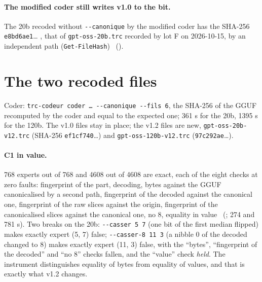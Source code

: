 \paragraph{The modified coder still writes v1.0 to the bit.} The 20b recoded without \texttt{-{}-canonique} by the modified coder has the SHA-256 \texttt{e8bd6ae1}\dots{} \parencite{fips180-4}, that of \texttt{gpt-oss-20b.trc} recorded by lot F on 2026-10-15, by an independent path (\texttt{Get-FileHash}) \mes~().

\section{The two recoded files}\label{t3cod:sec:fichiers}

Coder: \texttt{trc-codeur coder \dots{} -{}-canonique -{}-fils 6}, the SHA-256 of the GGUF recomputed by the coder and equal to the expected one; 361 s for the 20b, \num{1395} s for the 120b. The v1.0 files stay in place; the v1.2 files are new, \texttt{gpt-oss-20b-v12.trc} (SHA-256 \texttt{ef1cf740}\dots) and \texttt{gpt-oss-120b-v12.trc} (\texttt{97c292ae}\dots).

\paragraph{C1 in value.} 768 experts out of 768 and \num{4608} out of \num{4608} are exact, each of the eight checks at zero faults: fingerprint of the part, decoding, bytes against the GGUF canonicalised by a second path, fingerprint of the decoded against the canonical one, fingerprint of the raw slices against the origin, fingerprint of the canonicalised slices against the canonical one, no 8, equality in value \mes~(; 274 and 781 s). Two breaks on the 20b: \texttt{-{}-casser 5 7} (one bit of the first median flipped) makes exactly expert (5, 7) false; \texttt{-{}-casser-8 11 3} (a nibble 0 of the decoded changed to 8) makes exactly expert (11, 3) false, with the ``bytes'', ``fingerprint of the decoded'' and ``no 8'' checks fallen, and the ``value'' check \emph{held}. The instrument distinguishes equality of bytes from equality of values, and that is exactly what v1.2 changes.


